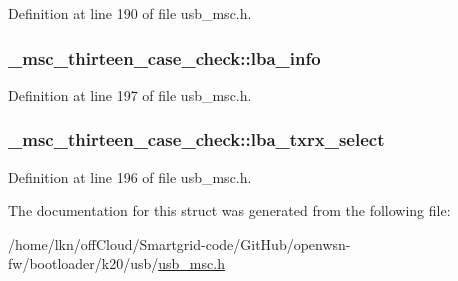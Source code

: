 Definition at line 190 of file usb\+\_\+msc.\+h.

\subsubsection[{\texorpdfstring{lba\+\_\+info}{lba_info}}]{ \+\_\+msc\+\_\+thirteen\+\_\+case\+\_\+check\+::lba\+\_\+info}\hypertarget{struct__msc__thirteen__case__check_adf0678cc97557349cfed3e5be2ffe99b}{}\label{struct__msc__thirteen__case__check_adf0678cc97557349cfed3e5be2ffe99b}


Definition at line 197 of file usb\+\_\+msc.\+h.

\subsubsection[{\texorpdfstring{lba\+\_\+txrx\+\_\+select}{lba_txrx_select}}]{ \+\_\+msc\+\_\+thirteen\+\_\+case\+\_\+check\+::lba\+\_\+txrx\+\_\+select}\hypertarget{struct__msc__thirteen__case__check_a036fae97f8ea1ff3fe0d3cdaaeb3a7ee}{}\label{struct__msc__thirteen__case__check_a036fae97f8ea1ff3fe0d3cdaaeb3a7ee}


Definition at line 196 of file usb\+\_\+msc.\+h.



The documentation for this struct was generated from the following file\+:\begin{DoxyCompactItemize}
\item 
/home/lkn/off\+Cloud/\+Smartgrid-\/code/\+Git\+Hub/openwsn-\/fw/bootloader/k20/usb/\hyperlink{usb__msc_8h}{usb\+\_\+msc.\+h}\end{DoxyCompactItemize}
